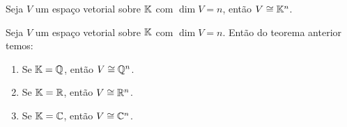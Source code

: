 \begin{teorema}
  Seja $V$ um espaço vetorial sobre $\mathbb{K}$  com $\dim V = n$, então $V \cong \mathbb{K}^n$.
\end{teorema}

\begin{observacoes}
  Seja $V$ um espaço vetorial sobre $\mathbb{K}$ com $\dim V = n$. Então do teorema anterior temos:
  \begin{enumerate}[label={\roman*})]
    \item Se $\mathbb{K} = \mathbb{Q}$, então $V \cong \mathbb{Q}^n$.

    \item Se $\mathbb{K} = \mathbb{R}$, então $V \cong \mathbb{R}^n$.

    \item Se $\mathbb{K} = \mathbb{C}$, então $V \cong \mathbb{C}^n$.
  \end{enumerate}
\end{observacoes}

